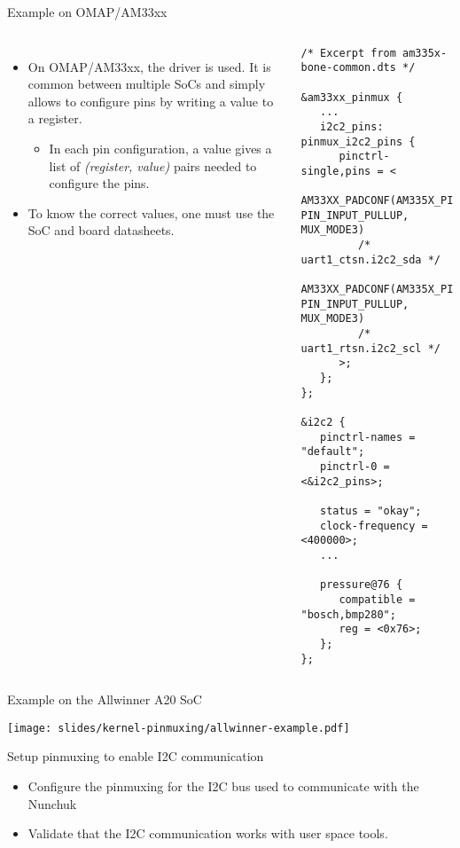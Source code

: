 \begin{frame}[fragile]{Example on OMAP/AM33xx}
  \begin{columns}
    \begin{itemize}
      \small
    \item On OMAP/AM33xx, the  driver is used. It
      is common between multiple SoCs and simply allows to configure
      pins by writing a value to a register.
      \begin{itemize}
      \item In each pin configuration, a  value
        gives a list of {\em (register, value)} pairs needed to configure
        the pins.
      \end{itemize}
    \item To know the correct values, one must use the SoC and board
      datasheets.
    \end{itemize}
    \begin{verbatim}
/* Excerpt from am335x-bone-common.dts */

&am33xx_pinmux {
   ...
   i2c2_pins: pinmux_i2c2_pins {
      pinctrl-single,pins = <
         AM33XX_PADCONF(AM335X_PIN_UART1_CTSN, PIN_INPUT_PULLUP, MUX_MODE3)
         /* uart1_ctsn.i2c2_sda */
         AM33XX_PADCONF(AM335X_PIN_UART1_RTSN, PIN_INPUT_PULLUP, MUX_MODE3)
         /* uart1_rtsn.i2c2_scl */
      >;
   };
};

&i2c2 {
   pinctrl-names = "default";
   pinctrl-0 = <&i2c2_pins>;

   status = "okay";
   clock-frequency = <400000>;
   ...

   pressure@76 {
      compatible = "bosch,bmp280";
      reg = <0x76>;
   };
};
    \end{verbatim}
  \end{columns}
\end{frame}

\begin{frame}[fragile]{Example on the Allwinner A20 SoC}
  \begin{center}
    \texttt{[image: slides/kernel-pinmuxing/allwinner-example.pdf]}
  \end{center}
\end{frame}

\setuplabframe
{Setup pinmuxing to enable I2C communication}
{
  \begin{itemize}
  \item Configure the pinmuxing for the I2C bus used to communicate
    with the Nunchuk
  \item Validate that the I2C communication works with user space
    tools.
  \end{itemize}
}
